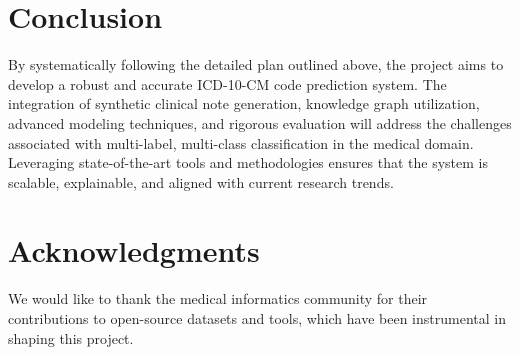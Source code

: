 \documentclass[12pt, a4paper]{article}
\begin{document}
\section{Conclusion}

By systematically following the detailed plan outlined above, the project aims to develop a robust and accurate ICD-10-CM code prediction system. The integration of synthetic clinical note generation, knowledge graph utilization, advanced modeling techniques, and rigorous evaluation will address the challenges associated with multi-label, multi-class classification in the medical domain. Leveraging state-of-the-art tools and methodologies ensures that the system is scalable, explainable, and aligned with current research trends.

\section*{Acknowledgments}

We would like to thank the medical informatics community for their contributions to open-source datasets and tools, which have been instrumental in shaping this project.



\end{document}
